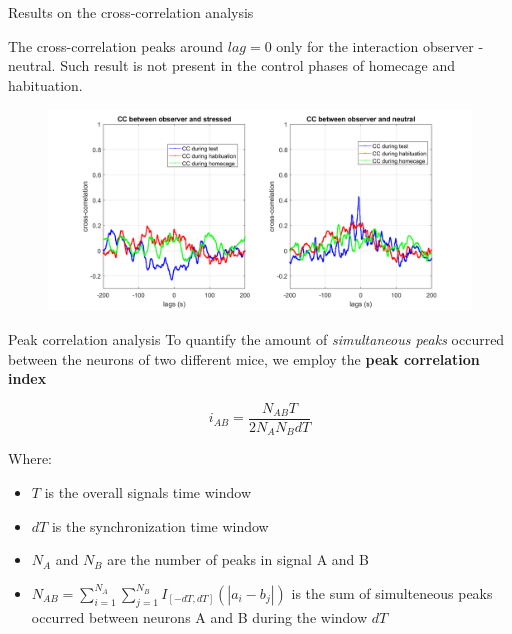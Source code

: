 \documentclass{beamer}
\begin{document}
\begin{frame}{Results on the cross-correlation analysis}

The cross-correlation peaks around $lag=0$ only for the interaction observer - neutral. Such result is not present in the control phases of homecage and habituation.


\begin{figure}[H]
	
	\centering
	\includegraphics[scale=0.3]{average_cc}

\end{figure}
	
\end{frame}

\begin{frame}{Peak correlation analysis}
To quantify the amount of \textit{simultaneous peaks} occurred between the neurons of two different mice, we employ the \textbf{peak correlation index}

$$ i_{AB} = \frac{N_{AB} T}{2 N_A N_B dT} $$ 

Where: \begin{itemize}
	
	\item $T$ is the overall signals time window 
	
	\item $dT$ is the synchronization time window
	
	\item $N_A$ and $N_B$ are the number of peaks in signal A and B
	
	\item $N_{AB} = \sum_{i=1}^{N_A} \sum_{j=1}^{N_B} I_{[-dT,dT]}(|a_i - b_j|) $ is the sum of simulteneous peaks occurred between neurons A and B during the window $dT$
\end{itemize}


\end{frame}
\end{document}
